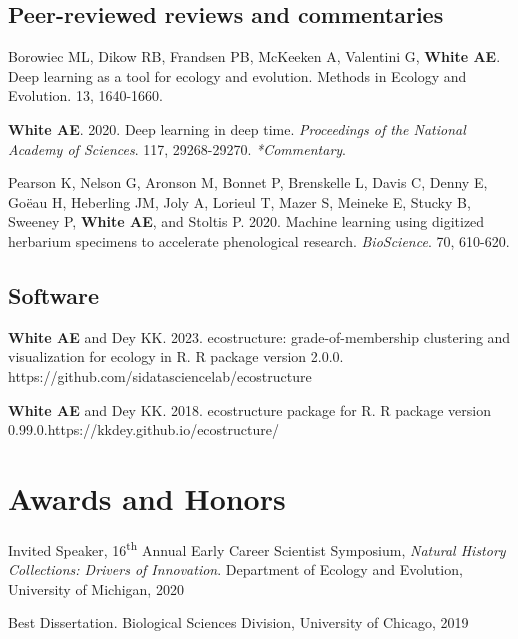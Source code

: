 \documentclass[letterpaper]{article}
\newenvironment{biblist}{%
   \begin{list}{}{%
     \setlength{\labelwidth}{0pt}%
     \setlength{\labelsep}{1em}%
     \setlength{\leftmargin}{2em}%
     \setlength{\itemindent}{-1em}%
   }
}{\end{list}}
\begin{document}
\subsection*{Peer-reviewed reviews and commentaries}
\begin{biblist}
\item Borowiec ML, Dikow RB, Frandsen PB, McKeeken A, Valentini G, \textbf{White AE}. Deep learning as a tool for ecology and evolution. Methods in Ecology and Evolution. 13, 1640-1660.

\item \textbf{White AE}. 2020. Deep learning in deep time. \textit{Proceedings of the National Academy of Sciences}. 117, 29268-29270. \textit{*Commentary}.

\item Pearson K, Nelson G, Aronson M, Bonnet P, Brenskelle L, Davis C, Denny E, Goëau H, Heberling JM, Joly A, Lorieul T, Mazer S, Meineke E, Stucky B, Sweeney P,\textbf{ White AE}, and Stoltis P. 2020. Machine learning using digitized herbarium specimens to accelerate phenological research. \textit{BioScience}. 70, 610-620.
\end{biblist}

\subsection*{Software}
\begin{biblist}
\item \textbf{White AE} and Dey KK. 2023. ecostructure: grade-of-membership clustering and visualization for ecology in R. R package version 2.0.0. https://github.com/sidatasciencelab/ecostructure

\item \textbf{White AE} and Dey KK. 2018. ecostructure package for R. R package version 0.99.0.\newline https://kkdey.github.io/ecostructure/

\end{biblist}

\section*{Awards and Honors}
\begin{biblist}
\item Invited Speaker, 16\textsuperscript{th} Annual Early Career Scientist Symposium, \textit{Natural History Collections: Drivers of Innovation}. Department of Ecology and Evolution, University of Michigan, 2020

\item Best Dissertation. Biological Sciences Division, University of Chicago, 2019
\end{biblist}
\end{document}
